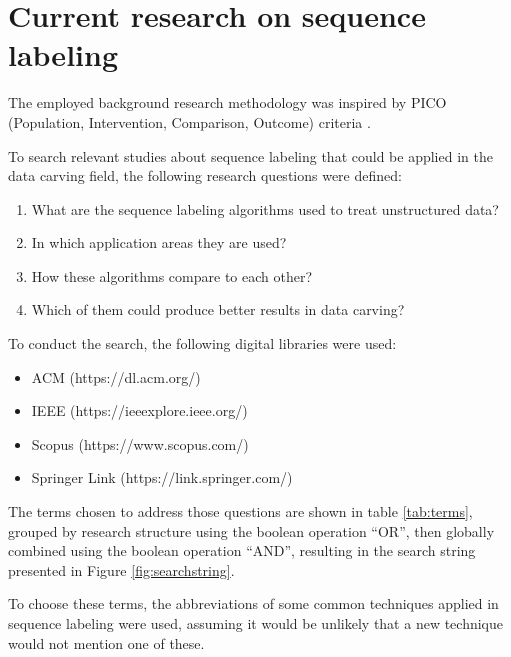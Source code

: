 \section{Current research on sequence labeling}
The employed background research methodology was inspired by PICO (Population, Intervention, Comparison, Outcome) criteria \cite{Kitchenham07guidelinesfor}.

To search relevant studies about sequence labeling that could be applied in the data carving field, the following research questions were defined:

\begin{enumerate}
\item   What are the sequence labeling algorithms used to treat unstructured data?
\item   In which application areas they are used?
\item   How these algorithms compare to each other?
\item   Which of them could produce better results in data carving?
\end{enumerate}


To conduct the search, the following digital libraries were used: 
\begin{itemize}
\item{ACM} (https://dl.acm.org/)
\item IEEE (https://ieeexplore.ieee.org/)
\item Scopus (https://www.scopus.com/) 
\item Springer Link (https://link.springer.com/)
\end{itemize}

The terms chosen to address those questions are shown in table \ref{tab:terms}, grouped by research structure using the boolean operation “OR”, then globally combined using the boolean operation “AND”, resulting in the search string presented in  Figure \ref{fig:searchstring}.

To choose these terms, the abbreviations of some common techniques applied in sequence labeling were used, assuming it would be unlikely that a new technique would not mention one of these.

